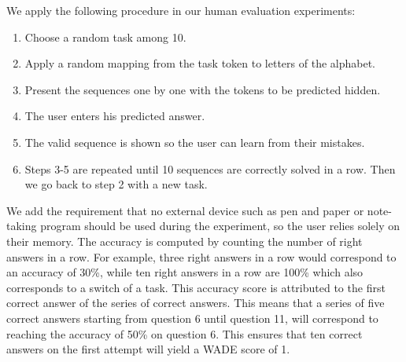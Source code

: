 We apply the following procedure in our human evaluation experiments:
\begin{enumerate}
  \item Choose a random task among 10.
  \item Apply a random mapping from the task token to letters of the alphabet.
  \item Present the sequences one by one with the tokens to be predicted hidden.
  \item The user enters his predicted answer.
  \item The valid sequence is shown so the user can learn from their mistakes.
  \item Steps 3-5 are repeated until 10 sequences are correctly solved in a row.
  Then we go back to step 2 with a new task.
\end{enumerate}
We add the requirement that no external device such as pen and paper or
note-taking program should be used during the experiment, so the user relies
solely on their memory. The accuracy is computed by counting the number of right
answers in a row. For example, three right answers in a row would correspond to
an accuracy of 30\%, while ten right answers in a row are 100\% which also
corresponds to a switch of a task. This accuracy score is attributed to the
first correct answer of the series of correct answers. This means that a series
of five correct answers starting from question 6 until question 11, will
correspond to reaching the accuracy of 50\% on question 6. This ensures that ten
correct answers on the first attempt will yield a WADE score of 1.

